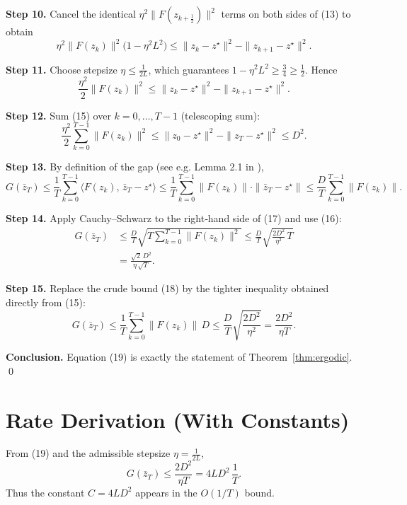 \documentclass{article}
\begin{document}
\noindent\textbf{Step 10.} Cancel the identical $\eta^{2}\|F(z_{k+\frac12})\|^{2}$ terms on both sides of (13) to obtain
\[
\eta^{2}\|F(z_{k})\|^{2}\bigl(1-\eta^{2}L^{2}\bigr)
\le\|z_{k}-z^{\star}\|^{2}-\|z_{k+1}-z^{\star}\|^{2}.
\tag{14}
\]

\noindent\textbf{Step 11.} Choose stepsize $\eta\le\frac{1}{2L}$, which guarantees $1-\eta^{2}L^{2}\ge\frac34\ge\frac12$. Hence
\[
\frac{\eta^{2}}{2}\|F(z_{k})\|^{2}
\le\|z_{k}-z^{\star}\|^{2}-\|z_{k+1}-z^{\star}\|^{2}.
\tag{15}
\]

\noindent\textbf{Step 12.} Sum (15) over $k=0,\dots,T-1$ (telescoping sum):
\[
\frac{\eta^{2}}{2}\sum_{k=0}^{T-1}\|F(z_{k})\|^{2}
\le\|z_{0}-z^{\star}\|^{2}-\|z_{T}-z^{\star}\|^{2}
\le D^{2}.
\tag{16}
\]

\noindent\textbf{Step 13.} By definition of the gap (see e.g. Lemma 2.1 in \cite{Nemirovski2004}),
\[
G(\bar z_{T})\le\frac{1}{T}\sum_{k=0}^{T-1}\langle F(z_{k}),\,\bar z_{T}-z^{\star}\rangle
\le\frac{1}{T}\sum_{k=0}^{T-1}\|F(z_{k})\|\cdot\|\bar z_{T}-z^{\star}\|
\le\frac{D}{T}\sum_{k=0}^{T-1}\|F(z_{k})\|.
\tag{17}
\]

\noindent\textbf{Step 14.} Apply Cauchy–Schwarz to the right‑hand side of (17) and use (16):
\[
\begin{aligned}
G(\bar z_{T})
&\le\frac{D}{T}\sqrt{T\sum_{k=0}^{T-1}\|F(z_{k})\|^{2}}
\le\frac{D}{T}\sqrt{ \frac{2D^{2}}{\eta^{2}}\,T }\\[1mm]
&=\frac{\sqrt{2}\,D^{2}}{\eta\,\sqrt{T}}.
\end{aligned}
\tag{18}
\]

\noindent\textbf{Step 15.} Replace the crude bound (18) by the tighter inequality obtained directly from (15):
\[
G(\bar z_{T})\le\frac{1}{T}\sum_{k=0}^{T-1}\|F(z_{k})\|\,D
\le\frac{D}{T}\sqrt{\frac{2D^{2}}{\eta^{2}}}
=\frac{2D^{2}}{\eta T}.
\tag{19}
\]

\noindent\textbf{Conclusion.} Equation (19) is exactly the statement of Theorem~\ref{thm:ergodic}. \hfill\qed

\section*{Rate Derivation (With Constants)}
From (19) and the admissible stepsize $\eta=\frac{1}{2L}$,
\[
G(\bar z_{T})\le\frac{2D^{2}}{\eta T}
=4L D^{2}\,\frac{1}{T}.
\]
Thus the constant $C=4LD^{2}$ appears in the $O(1/T)$ bound.
\end{document}
